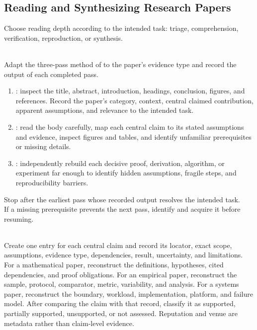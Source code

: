 \subsection{Reading and Synthesizing Research Papers}

Choose reading depth according to the intended task: triage, comprehension, verification, reproduction, or synthesis.

\begin{process} \label{proc:three-pass-paper-reading} \\
Adapt the three-pass method of \citet{keshav2007readpaper} to the paper's evidence type and record the output of each completed pass.
\begin{enumerate}[label=(\roman*)]
\setlength{\itemsep}{0pt}
\item {}: inspect the title, abstract, introduction, headings, conclusion, figures, and references. Record the paper's category, context, central claimed contribution, apparent assumptions, and relevance to the intended task.
\item {}: read the body carefully, map each central claim to its stated assumptions and evidence, inspect figures and tables, and identify unfamiliar prerequisites or missing details.
\item {}: independently rebuild each decisive proof, derivation, algorithm, or experiment far enough to identify hidden assumptions, fragile steps, and reproducibility barriers.
\end{enumerate}
Stop after the earliest pass whose recorded output resolves the intended task.\\
If a missing prerequisite prevents the next pass, identify and acquire it before resuming.
\end{process}

\begin{process} \label{proc:paper-claim-evidence-ledger} \\
Create one entry for each central claim and record its locator, exact scope, assumptions, evidence type, dependencies, result, uncertainty, and limitations. For a mathematical paper, reconstruct the definitions, hypotheses, cited dependencies, and proof obligations. For an empirical paper, reconstruct the sample, protocol, comparator, metric, variability, and analysis. For a systems paper, reconstruct the boundary, workload, implementation, platform, and failure model. After comparing the claim with that record, classify it as supported, partially supported, unsupported, or not assessed. Reputation and venue are metadata rather than claim-level evidence.
\end{process}


